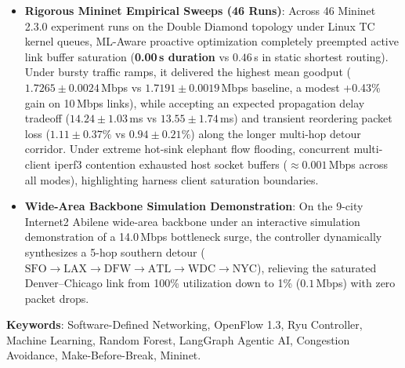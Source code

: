 \documentclass[11pt,a4paper,oneside]{report}
\begin{document}
\begin{itemize}[leftmargin=1.2em,itemsep=2pt,topsep=3pt,parsep=0pt]
  \item \textbf{Rigorous Mininet Empirical Sweeps (46 Runs)}: Across 46 Mininet 2.3.0 experiment runs on the Double Diamond topology under Linux TC kernel queues, ML-Aware proactive optimization completely preempted active link buffer saturation (\textbf{0.00\,s duration} vs $0.46$\,s in static shortest routing). Under bursty traffic ramps, it delivered the highest mean goodput ($1.7265 \pm 0.0024$\,Mbps vs $1.7191 \pm 0.0019$\,Mbps baseline, a modest +0.43\% gain on 10\,Mbps links), while accepting an expected propagation delay tradeoff ($14.24 \pm 1.03$\,ms vs $13.55 \pm 1.74$\,ms) and transient reordering packet loss ($1.11 \pm 0.37\%$ vs $0.94 \pm 0.21\%$) along the longer multi-hop detour corridor. Under extreme hot-sink elephant flow flooding, concurrent multi-client iperf3 contention exhausted host socket buffers ($\approx 0.001$\,Mbps across all modes), highlighting harness client saturation boundaries.
  \item \textbf{Wide-Area Backbone Simulation Demonstration}: On the 9-city Internet2 Abilene wide-area backbone under an interactive simulation demonstration of a 14.0\,Mbps bottleneck surge, the controller dynamically synthesizes a 5-hop southern detour ($\text{SFO} \to \text{LAX} \to \text{DFW} \to \text{ATL} \to \text{WDC} \to \text{NYC}$), relieving the saturated Denver--Chicago link from 100\% utilization down to 1\% ($0.1$\,Mbps) with zero packet drops.
\end{itemize}

\vspace{0.4cm}
\noindent\textbf{Keywords}: Software-Defined Networking, OpenFlow 1.3, Ryu Controller, Machine Learning, Random Forest, LangGraph Agentic AI, Congestion Avoidance, Make-Before-Break, Mininet.

\clearpage

\setcounter{tocdepth}{1}
\tableofcontents
\clearpage

\begingroup
\makeatletter
\renewcommand{\clearpage}{\relax}
\renewcommand{\cleardoublepage}{\relax}
\makeatother
\listoffigures
\vspace{0.8cm}
\listoftables
\endgroup
\clearpage









\end{document}
